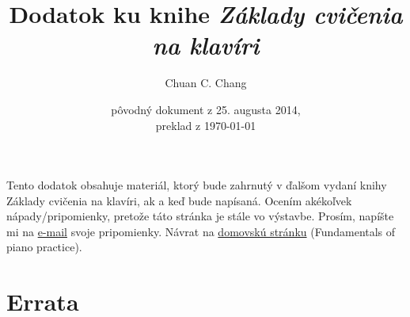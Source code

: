 \documentclass[11pt,a4paper%
]{article}
\title{Dodatok ku knihe \emph{Základy cvičenia na klavíri}}
\author{Chuan C. Chang}
\date{pôvodný dokument z 25. augusta 2014,\\preklad z \today}
\begin{document}
\maketitle
Tento dodatok obsahuje materiál, ktorý bude zahrnutý v ďalšom vydaní knihy Základy cvičenia na klavíri, ak a keď bude napísaná. Ocením akékoľvek nápady/pripomienky, pretože táto stránka je stále vo výstavbe. Prosím, napíšte mi na \href{mailto:cc88m@aol.com?subject=Addendum\%20Comments}{e-mail} svoje pripomienky.
Návrat na \href{http://www.pianopractice.org/}{domovskú stránku} (Fundamentals of piano practice).

\tableofcontents

\section*{Errata}

\end{document}
